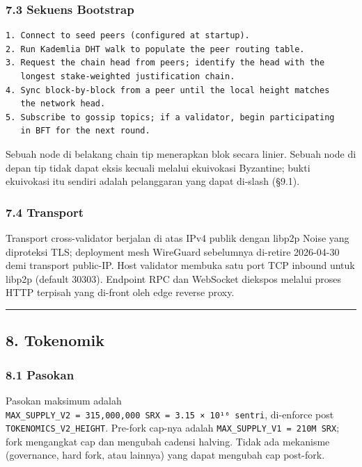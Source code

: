 \documentclass[11pt,a4paper]{article}
\begin{document}
\hypertarget{sekuens-bootstrap}{%
\subsubsection{7.3 Sekuens Bootstrap}\label{sekuens-bootstrap}}

\begin{verbatim}
1. Connect to seed peers (configured at startup).
2. Run Kademlia DHT walk to populate the peer routing table.
3. Request the chain head from peers; identify the head with the
   longest stake-weighted justification chain.
4. Sync block-by-block from a peer until the local height matches
   the network head.
5. Subscribe to gossip topics; if a validator, begin participating
   in BFT for the next round.
\end{verbatim}

Sebuah node di belakang chain tip menerapkan blok secara linier. Sebuah node di depan tip tidak dapat eksis kecuali melalui ekuivokasi Byzantine; bukti ekuivokasi itu sendiri adalah pelanggaran yang dapat di-slash (§9.1).

\hypertarget{transport}{%
\subsubsection{7.4 Transport}\label{transport}}

Transport cross-validator berjalan di atas IPv4 publik dengan libp2p Noise yang diproteksi TLS; deployment mesh WireGuard sebelumnya di-retire 2026-04-30 demi transport public-IP. Host validator membuka satu port TCP inbound untuk libp2p (default 30303). Endpoint RPC dan WebSocket diekspos melalui proses HTTP terpisah yang di-front oleh edge reverse proxy.

\begin{center}\rule{0.5\linewidth}{0.5pt}\end{center}

\hypertarget{tokenomik}{%
\subsection{8. Tokenomik}\label{tokenomik}}

\hypertarget{pasokan}{%
\subsubsection{8.1 Pasokan}\label{pasokan}}

Pasokan maksimum adalah \texttt{MAX\_SUPPLY\_V2\ =\ 315,000,000\ SRX\ =\ 3.15\ ×\ 10¹⁶\ sentri}, di-enforce post \texttt{TOKENOMICS\_V2\_HEIGHT}. Pre-fork cap-nya adalah \texttt{MAX\_SUPPLY\_V1\ =\ 210M\ SRX}; fork mengangkat cap dan mengubah cadensi halving. Tidak ada mekanisme (governance, hard fork, atau lainnya) yang dapat mengubah cap post-fork.
\end{document}
